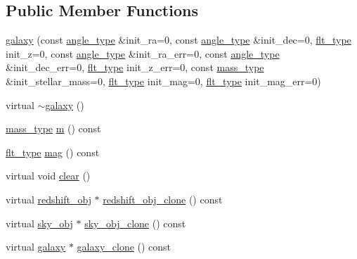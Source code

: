 \subsection*{Public Member Functions}
\begin{DoxyCompactItemize}
\item 
\hyperlink{classIceBRG_1_1galaxy_addd35301cca549dd4ed3631a4dcb628e}{galaxy} (const \hyperlink{namespaceIceBRG_a688eeb0811a2474b20b667ed2e9625a1}{angle\+\_\+type} \&init\+\_\+ra=0, const \hyperlink{namespaceIceBRG_a688eeb0811a2474b20b667ed2e9625a1}{angle\+\_\+type} \&init\+\_\+dec=0, \hyperlink{lib_2IceBRG__main_2common_8h_ad0f130a56eeb944d9ef2692ee881ecc4}{flt\+\_\+type} init\+\_\+z=0, const \hyperlink{namespaceIceBRG_a688eeb0811a2474b20b667ed2e9625a1}{angle\+\_\+type} \&init\+\_\+ra\+\_\+err=0, const \hyperlink{namespaceIceBRG_a688eeb0811a2474b20b667ed2e9625a1}{angle\+\_\+type} \&init\+\_\+dec\+\_\+err=0, \hyperlink{lib_2IceBRG__main_2common_8h_ad0f130a56eeb944d9ef2692ee881ecc4}{flt\+\_\+type} init\+\_\+z\+\_\+err=0, const \hyperlink{namespaceIceBRG_a1be72ac4918a9b029f2eefa084213e35}{mass\+\_\+type} \&init\+\_\+stellar\+\_\+mass=0, \hyperlink{lib_2IceBRG__main_2common_8h_ad0f130a56eeb944d9ef2692ee881ecc4}{flt\+\_\+type} init\+\_\+mag=0, \hyperlink{lib_2IceBRG__main_2common_8h_ad0f130a56eeb944d9ef2692ee881ecc4}{flt\+\_\+type} init\+\_\+mag\+\_\+err=0)
\item 
virtual \hyperlink{classIceBRG_1_1galaxy_ac4ff33070ba5b93e4a380dbf1a4bc383}{$\sim$galaxy} ()
\item 
\hyperlink{namespaceIceBRG_a1be72ac4918a9b029f2eefa084213e35}{mass\+\_\+type} \hyperlink{classIceBRG_1_1galaxy_abbe29ca14e53a5d12201be91aa1b4b30}{m} () const 
\item 
\hyperlink{lib_2IceBRG__main_2common_8h_ad0f130a56eeb944d9ef2692ee881ecc4}{flt\+\_\+type} \hyperlink{classIceBRG_1_1galaxy_ac4f8b983ac10ad86df0a2f90ce7f7593}{mag} () const 
\item 
virtual void \hyperlink{classIceBRG_1_1galaxy_a6a37d60a5b748e99f0c9dfac82b8ae4c}{clear} ()
\item 
virtual \hyperlink{classIceBRG_1_1redshift__obj}{redshift\+\_\+obj} $\ast$ \hyperlink{classIceBRG_1_1galaxy_a0874bd3cb3133f244a86d6101aa1ec65}{redshift\+\_\+obj\+\_\+clone} () const 
\item 
virtual \hyperlink{classIceBRG_1_1sky__obj}{sky\+\_\+obj} $\ast$ \hyperlink{classIceBRG_1_1galaxy_ae6c5cfc58523edcffcf9e8bdd90bc1ad}{sky\+\_\+obj\+\_\+clone} () const 
\item 
virtual \hyperlink{classIceBRG_1_1galaxy}{galaxy} $\ast$ \hyperlink{classIceBRG_1_1galaxy_a58037140e845c9cd31c51e5751c28792}{galaxy\+\_\+clone} () const 
\end{DoxyCompactItemize}
